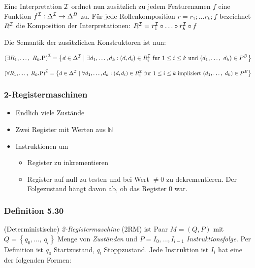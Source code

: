 Eine Interpretation $\mathcal{I}$ ordnet nun zusätzlich zu jedem Featurenamen
$f$ eine Funktion $f^{\mathcal{I}}:\Delta^{\mathcal{I}} \rightarrow \Delta^{B}$ zu. Für
jede Rollenkomposition $r = r_1;\ldots r_{k};f$ bezeichnet $R^{\mathcal{I}}$
die Komposition der Interpretationen:
$R^{\mathcal{I}} = r_1^{\mathcal{I}} \circ \ldots \circ r_{k}^{\mathcal{I}} \circ f$

Die Semantik der zusätzlichen Konstruktoren ist nun:

\[\left( \exists R_1,\ldots,\ R_{k}\text{.P} \right)^\MI = \left\{ d \in \Delta^\MI\ |\ \exists d_1,\ldots,d_{k}:\left( d,d_{i} \right) \in R_{i}^\MI\ \mathrm{fur}\ 1 \leq i \leq k\ \mathrm{\text{und}}\ \left( d_1,\ldots,\ d_{k} \right) \in P^{B} \right\}\]

\[\left( \forall R_1,\ldots,\ R_{k}\text{.P} \right)^\MI = \left\{ d \in \Delta^\MI\ |\ \forall d_1,\ldots,d_{k}:\left( d,d_{i} \right) \in R_{i}^\MI\ \mathrm{fur}\ 1 \leq i \leq k\ \mathrm{\text{impliziert}}\ \left( d_1,\ldots,\ d_{k} \right) \in P^{B} \right\}\]

\subsubsection{2-Registermaschinen}\label{registermaschinen}

\begin{itemize}
\item
  Endlich viele Zustände
\item
  Zwei Register mit Werten aus $\mathbb{N}$
\item
  Instruktionen um

  \begin{itemize}
  \item
    Register zu inkrementieren
  \item
    Register auf null zu testen und bei Wert $\neq 0$ zu
    dekrementieren. Der Folgezustand hängt davon ab, ob das Register
    $0$ war.
  \end{itemize}
\end{itemize}

\subsubsection{Definition 5.30}\label{definition-5.30}

(Deterministische) \emph{2-Registermaschine} (2RM) ist Paar
$M = \left( Q,P \right)$ mit
$Q = \left\{ q_{0},\ldots,\ q_{l} \right\}$ Menge von \emph{Zuständen}
und $P = I_{0},\ldots,I_{l - 1}$ \emph{Instruktionsfolge}. Per
Definition ist $q_{0}$ Startzustand, $q_{l}$ Stoppzustand. Jede
Instruktion ist $I_{i}$ hat eine der folgenden Formen:

